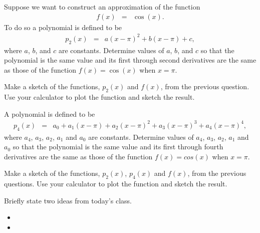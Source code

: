 \begin{problem}
\item Suppose we want to construct an approximation of the function
  \begin{eqnarray*}
    f(x) & = & \cos(x).
  \end{eqnarray*}
  To do so a polynomial is defined to be
  \begin{eqnarray*}
    p_2(x) & = & a (x-\pi)^2 + b (x-\pi) + c,
  \end{eqnarray*}
  where $a$, $b$, and $c$ are constants.  Determine
  values of $a$, $b$,  and $c$ so that the
  polynomial is the same value and its first through second
  derivatives are the same as those of the function $f(x)=\cos(x)$ when
  $x=\pi$.
  \vfill

\item Make a sketch of the functions, $p_2(x)$ and $f(x)$, from the
  previous question. Use your calculator to plot the function and
  sketch the result.

  \vspace{5em}


  \clearpage

\item A polynomial is defined to be
  \begin{eqnarray*}
    p_4(x) & = &  a_0 + a_1 (x-\pi) +  a_2 (x-\pi)^2 +  a_3 (x-\pi)^3 +  a_4 (x-\pi)^4,
  \end{eqnarray*}
  where $a_4$, $a_3$, $a_2$, $a_1$ and $a_0$ are constants.  Determine
  values of $a_4$, $a_3$, $a_2$, $a_1$ and $a_0$ so that the
  polynomial is the same value and its first through fourth
  derivatives are the same as those of the function $f(x)=cos(x)$ when
  $x=\pi$.

  \vfill

\item Make a sketch of the functions, $p_2(x)$, $p_4(x)$ and $f(x)$,
  from the previous questions. Use your calculator to plot the
  function and sketch the result.

  \vspace{5em}


\end{problem}


\postClass

\begin{problem}
\item Briefly state two ideas from today's class.
  \begin{itemize}
  \item
  \item
  \end{itemize}
\item
  \begin{subproblem}
    \item
  \end{subproblem}
\end{problem}


